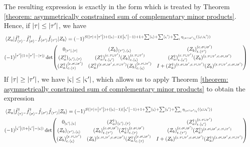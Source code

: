 \documentclass[12pt]{article}
\newcommand{\seq}[1]{\langle #1\rangle}
\newcommand{\hc}{^\dagger}
\begin{document}
	The resulting expression is exactly in the form which is treated by Theorem \ref{theorem: asymmetrically constrained sum of complementary minor products}. Hence, if $\abs{\tau}\leq\abs{\tau'}$, we have
	\begin{align} \label{eq: general reduced overlap determinant}
	&\mel{Z_a}{\hat{f}\hc_{\seq{\tau}^-}\hat{f}\hc_{\seq{\sigma}^-}\hat{f}_{\seq{\sigma'}}\hat{f}_{\seq{\tau'}}}{Z_b}=(-1)^{S(\abs{\tau}+\abs{\tau'})+(\abs{\varsigma}-1)(\abs{\varsigma'}-1)+1+\sum\seq{\varsigma}+\sum\seq{\varsigma'}+\sum_i\eta_{(\sigma\cap\sigma')_i}(\seq{\varsigma\cup\varsigma'})}\nonumber\\
	&(-1)^{\abs{\tau'}(1+\abs{\tau'}-\abs{\tau})}\det(\mqty{
		0_{\abs{\tau'},\abs{\tau}} & (Z_b)_{\seq{\tau'},\seq{\varsigma}} & (Z_b)^{(\text{c.} \sigma\cup\sigma')}_{\text{r.} \seq{\tau'}}\\
		(Z_a\hc)_{\seq{\varsigma'},\seq{\tau}} & (Z_a\hc)^{(\text{c.} \tau\cup\tau')}_{\text{r.} \seq{\varsigma'}}(Z_b)^{(\text{r.} \tau\cup\tau')}_{\text{c.} \seq{\varsigma}} & (Z_a\hc)^{(\text{c.} \tau\cup\tau')}_{\text{r.} \seq{\varsigma'}}(Z_b)^{(\text{r.} \tau\cup\tau', \text{c.} \sigma\cup\sigma')}\\
		(Z_a\hc)^{(\text{r.} \sigma\cup\sigma')}_{\text{c.} \seq{\tau}} & (Z_a\hc)^{(\text{r.} \sigma\cup\sigma', \text{c.} \tau\cup\tau')}(Z_b)^{(\text{r.} \tau\cup\tau')}_{\text{c.} \seq{\varsigma}} & I + (Z_a\hc)^{(\text{r.} \sigma\cup\sigma', \text{c.} \tau\cup\tau')}(Z_b)^{(\text{r.} \tau\cup\tau', \text{c.} \sigma\cup\sigma')}
	})
	\end{align}
	If $\abs{\tau}\geq\abs{\tau'}$, we have $\abs{\varsigma}\leq\abs{\varsigma'}$, which allows us to apply Theorem \ref{theorem: asymmetrically constrained sum of complementary minor products} to obtain the expression
	\begin{align} \label{eq: general reduced overlap determinant alt}
	&\mel{Z_a}{\hat{f}\hc_{\seq{\tau}^-}\hat{f}\hc_{\seq{\sigma}^-}\hat{f}_{\seq{\sigma'}}\hat{f}_{\seq{\tau'}}}{Z_b}=(-1)^{S(\abs{\tau}+\abs{\tau'})+(\abs{\varsigma}-1)(\abs{\varsigma'}-1)+1+\sum\seq{\varsigma}+\sum\seq{\varsigma'}+\sum_i\eta_{(\sigma\cap\sigma')_i}(\seq{\varsigma\cup\varsigma'})}\nonumber\\
	&(-1)^{\abs{\varsigma'}(1+\abs{\varsigma'}-\abs{\varsigma})}\det(\mqty{
		0_{\abs{\varsigma'},\abs{\varsigma}} & (Z_a\hc)_{\seq{\varsigma'},\seq{\tau}} & (Z_a\hc)^{(\text{c.} \tau\cup\tau')}_{\text{r.} \seq{\varsigma'}}\\		
		(Z_b)_{\seq{\tau'},\seq{\varsigma}} & (Z_b)^{(\text{c.} \sigma\cup\sigma')}_{\text{r.} \seq{\tau'}}(Z_a\hc)^{(\text{r.} \sigma\cup\sigma')}_{\text{c.} \seq{\tau}} & (Z_b)^{(\text{c.} \sigma\cup\sigma')}_{\text{r.} \seq{\tau'}}(Z_a\hc)^{(\text{r.} \sigma\cup\sigma', \text{c.} \tau\cup\tau')}\\	
		(Z_b)^{(\text{r.} \tau\cup\tau')}_{\text{c.} \seq{\varsigma}} & (Z_b)^{(\text{r.} \tau\cup\tau', \text{c.} \sigma\cup\sigma')}(Z_a\hc)^{(\text{r.} \sigma\cup\sigma')}_{\text{c.} \seq{\tau}} & I + (Z_b)^{(\text{r.} \tau\cup\tau', \text{c.} \sigma\cup\sigma')}(Z_a\hc)^{(\text{r.} \sigma\cup\sigma', \text{c.} \tau\cup\tau')}
	})
	\end{align}
\end{document}
